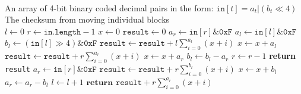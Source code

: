 \documentclass{article}
\begin{document}
\begin{algorithm}
    \caption{}
    \begin{algorithmic}
        \Require
            {\\An array of 4-bit binary coded decimal pairs in the form: $\texttt{in}[t]=a_t|(b_t\ll 4)$}
        \Ensure
            {\\The checksum from moving individual blocks\\}
        \hrulefill
        \State$l\gets 0$
        \State$r\gets\texttt{in.length}-1$
        \State$x\gets 0$
        \State$\texttt{result}\gets 0$
        \State$a_r\gets\texttt{in}[r]\&\texttt{0xF}$
            \State$a_l\gets\texttt{in}[l]\&\texttt{0xF}$
            \State$b_l\gets(\texttt{in}[l]\gg 4)\&\texttt{0xF}$
            \State$\texttt{result}\gets\texttt{result}+l\displaystyle\sum_{i=0}^{a_l}{(x+i)}$
            \State$x\gets x+a_l$
                \State$\texttt{result}\gets\texttt{result}+r\displaystyle\sum_{i=0}^{a_r}{(x+i)}$
                \State$x\gets x+a_r$
                \State$b_l\gets b_l-a_r$
                \State$r\gets r-1$
                    \State\textbf{return}\texttt{ result}
                \EndIf
                \State$a_r\gets\texttt{in}[r]\&\texttt{0xF}$
            \EndWhile
            \State$\texttt{result}\gets\texttt{result}+r\displaystyle\sum_{i=0}^{b_l}{(x+i)}$
            \State$x\gets x+b_l$
            \State$a_r\gets a_r-b_l$
            \State$l\gets l+1$
        \EndWhile
        \State$\textbf{return}\texttt{ result}+r\displaystyle\sum_{i=0}^{a_r}{(x+i)}$
    \end{algorithmic}
\end{algorithm}
\end{document}
